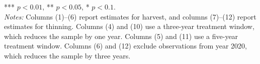 \documentclass{article}
\begin{document}
\clearpage
\begin{landscape}
\begin{table}[!htbp]
\centering
\caption*{Table A6. Robustness of the Effects of Harvest and Thinning on County-Level Wildfire Burned Area}
\label{tab:A3}


\vspace{0.5em}

\begin{minipage}{\textwidth}
\footnotesize
*** $p<0.01$, ** $p<0.05$, * $p<0.1$.\\
\textit{Notes:} Columns (1)--(6) report estimates for harvest, and columns (7)--(12) report estimates for thinning. Columns (4) and (10) use a three-year treatment window,
 which reduces the sample by one year. Columns (5) and (11) use a five-year treatment window. Columns (6) and (12) exclude observations from year 2020, which reduces the
  sample by three years.
\end{minipage}

\end{table}
\end{landscape}
\clearpage
\end{document}
